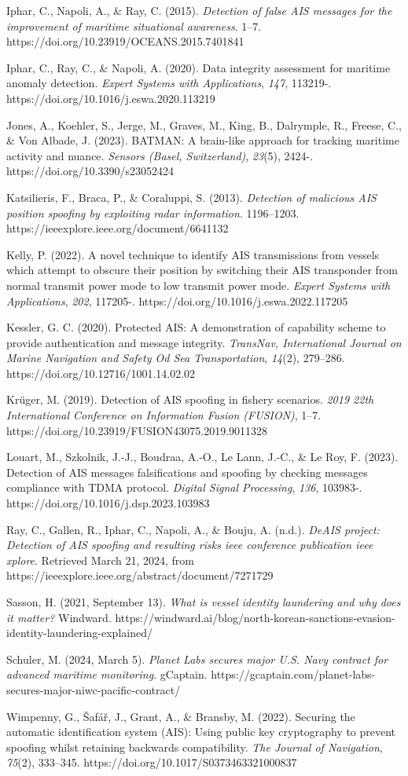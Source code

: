 \documentclass[
]{article}
\begin{document}
Iphar, C., Napoli, A., \& Ray, C. (2015). \emph{Detection of false AIS
messages for the improvement of maritime situational awareness}. 1--7.
https://doi.org/10.23919/OCEANS.2015.7401841

Iphar, C., Ray, C., \& Napoli, A. (2020). Data integrity assessment for
maritime anomaly detection. \emph{Expert Systems with Applications},
\emph{147}, 113219-. https://doi.org/10.1016/j.eswa.2020.113219

Jones, A., Koehler, S., Jerge, M., Graves, M., King, B., Dalrymple, R.,
Freese, C., \& Von Albade, J. (2023). BATMAN: A brain-like approach for
tracking maritime activity and nuance. \emph{Sensors (Basel,
Switzerland)}, \emph{23}(5), 2424-. https://doi.org/10.3390/s23052424

Katsilieris, F., Braca, P., \& Coraluppi, S. (2013). \emph{Detection of
malicious AIS position spoofing by exploiting radar information}.
1196--1203. https://ieeexplore.ieee.org/document/6641132

Kelly, P. (2022). A novel technique to identify AIS transmissions from
vessels which attempt to obscure their position by switching their AIS
transponder from normal transmit power mode to low transmit power mode.
\emph{Expert Systems with Applications}, \emph{202}, 117205-.
https://doi.org/10.1016/j.eswa.2022.117205

Kessler, G. C. (2020). Protected AIS: A demonstration of capability
scheme to provide authentication and message integrity. \emph{TransNav,
International Journal on Marine Navigation and Safety Od Sea
Transportation}, \emph{14}(2), 279--286.
https://doi.org/10.12716/1001.14.02.02

Krüger, M. (2019). Detection of AIS spoofing in fishery scenarios.
\emph{2019 22th International Conference on Information Fusion
(FUSION)}, 1--7. https://doi.org/10.23919/FUSION43075.2019.9011328

Louart, M., Szkolnik, J.-J., Boudraa, A.-O., Le Lann, J.-C., \& Le Roy,
F. (2023). Detection of AIS messages falsifications and spoofing by
checking messages compliance with TDMA protocol. \emph{Digital Signal
Processing}, \emph{136}, 103983-.
https://doi.org/10.1016/j.dsp.2023.103983

Ray, C., Gallen, R., Iphar, C., Napoli, A., \& Bouju, A. (n.d.).
\emph{DeAIS project: Detection of AIS spoofing and resulting risks
\textbar{} ieee conference publication \textbar{} ieee xplore}.
Retrieved March 21, 2024, from
https://ieeexplore.ieee.org/abstract/document/7271729

Sasson, H. (2021, September 13). \emph{What is vessel identity
laundering and why does it matter?} Windward.
https://windward.ai/blog/north-korean-sanctions-evasion-identity-laundering-explained/

Schuler, M. (2024, March 5). \emph{Planet Labs secures major U.S. Navy
contract for advanced maritime monitoring}. gCaptain.
https://gcaptain.com/planet-labs-secures-major-niwc-pacific-contract/

Wimpenny, G., Šafář, J., Grant, A., \& Bransby, M. (2022). Securing the
automatic identification system (AIS): Using public key cryptography to
prevent spoofing whilst retaining backwards compatibility. \emph{The
Journal of Navigation}, \emph{75}(2), 333--345.
https://doi.org/10.1017/S0373463321000837
\end{document}

